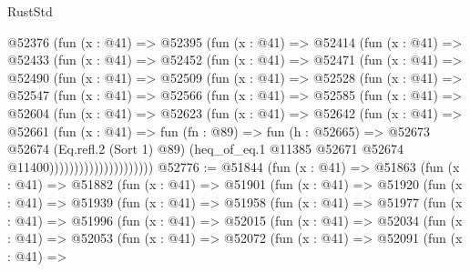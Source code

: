 \begin{lexlean}{RustStd}
\begin{coremodule}
          @52376
            (fun (x : @41) =>
            @52395
              (fun (x : @41) =>
              @52414
                (fun (x : @41) =>
                @52433
                  (fun (x : @41) =>
                  @52452
                    (fun (x : @41) =>
                    @52471
                      (fun (x : @41) =>
                      @52490
                        (fun (x : @41) =>
                        @52509
                          (fun (x : @41) =>
                          @52528
                            (fun (x : @41) =>
                            @52547
                              (fun (x : @41) =>
                              @52566
                                (fun (x : @41) =>
                                @52585
                                  (fun (x : @41) =>
                                  @52604
                                    (fun (x : @41) =>
                                    @52623
                                      (fun (x : @41) =>
                                      @52642
                                        (fun (x : @41) =>
                                        @52661
                                          (fun (x : @41) =>
                                          fun (fn : @89) =>
                                          fun (h : @52665) =>
                                          @52673
                                            @52674
                                            (Eq.refl.{2} (Sort 1) @89)
                                            (heq_of_eq.{1}
                                              @11385
                                              @52671
                                              @52674
                                              @11400)))))))))))))))))))))
@52776 := @51844
    (fun (x : @41) =>
    @51863
      (fun (x : @41) =>
      @51882
        (fun (x : @41) =>
        @51901
          (fun (x : @41) =>
          @51920
            (fun (x : @41) =>
            @51939
              (fun (x : @41) =>
              @51958
                (fun (x : @41) =>
                @51977
                  (fun (x : @41) =>
                  @51996
                    (fun (x : @41) =>
                    @52015
                      (fun (x : @41) =>
                      @52034
                        (fun (x : @41) =>
                        @52053
                          (fun (x : @41) =>
                          @52072
                            (fun (x : @41) =>
                            @52091
                              (fun (x : @41) =>

\end{coremodule}
\end{lexlean}
